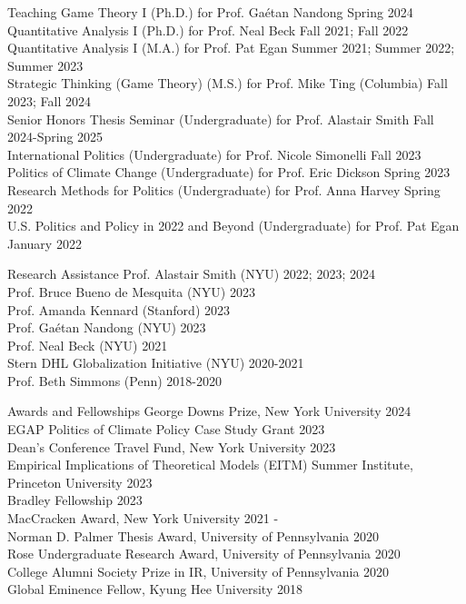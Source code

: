 \documentclass{resume} %
\begin{document}

\begin{rSection}{Teaching}
Game Theory I (Ph.D.) for Prof. Ga\'etan Nandong \hfill Spring 2024\\
Quantitative Analysis I (Ph.D.) for Prof. Neal Beck \hfill Fall 2021; Fall 2022\\
Quantitative Analysis I (M.A.) for Prof. Pat Egan \hfill Summer 2021; Summer 2022; Summer 2023\\
Strategic Thinking (Game Theory) (M.S.) for Prof. Mike Ting (Columbia) \hfill Fall 2023; Fall 2024\\
Senior Honors Thesis Seminar (Undergraduate) for Prof. Alastair Smith \hfill Fall 2024-Spring 2025\\
International Politics (Undergraduate) for Prof. Nicole Simonelli \hfill Fall 2023\\
Politics of Climate Change (Undergraduate) for Prof. Eric Dickson \hfill Spring 2023\\
Research Methods for Politics (Undergraduate) for Prof. Anna Harvey \hfill Spring 2022\\
U.S. Politics and Policy in 2022 and Beyond (Undergraduate) for Prof. Pat Egan \hfill January 2022
\end{rSection}

\begin{rSection}{Research Assistance}
    Prof. Alastair Smith (NYU) \hfill 2022; 2023; 2024\\
    Prof. Bruce Bueno de Mesquita (NYU) \hfill 2023\\
    Prof. Amanda Kennard (Stanford) \hfill 2023\\
    Prof. Ga\'etan Nandong (NYU) \hfill 2023\\
    Prof. Neal Beck (NYU) \hfill 2021\\
    Stern DHL Globalization Initiative (NYU) \hfill 2020-2021\\
    Prof. Beth Simmons (Penn) \hfill 2018-2020
\end{rSection}

\begin{rSection}{Awards and Fellowships}
George Downs Prize, New York University \hfill 2024\\
EGAP Politics of Climate Policy Case Study Grant \hfill 2023\\
Dean's Conference Travel Fund, New York University \hfill 2023\\
Empirical Implications of Theoretical Models (EITM) Summer Institute, Princeton University \hfill 2023\\
Bradley Fellowship \hfill 2023\\
MacCracken Award, New York University \hfill 2021 - \\
Norman D. Palmer Thesis Award, University of Pennsylvania \hfill 2020\\
Rose Undergraduate Research Award, University of Pennsylvania \hfill 2020\\
College Alumni Society Prize in IR, University of Pennsylvania \hfill 2020\\
Global Eminence Fellow, Kyung Hee University \hfill 2018
\end{rSection}
\end{document}
